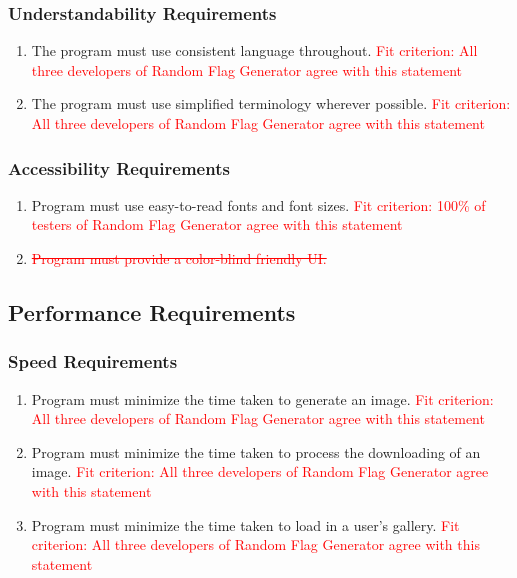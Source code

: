 \documentclass[12pt, titlepage]{article}
\begin{document}
\subsubsection{Understandability Requirements}
\begin{enumerate}[label=UH\arabic*., resume=uhs]
    \item The program must use consistent language throughout. \textcolor{red}{Fit criterion: All three developers of Random Flag Generator agree with this statement}
    \item The program must use simplified terminology wherever possible. \textcolor{red}{Fit criterion: All three developers of Random Flag Generator agree with this statement}
\end{enumerate}

\subsubsection{Accessibility Requirements}
\begin{enumerate}[label=UH\arabic*., resume=uhs]
    \item Program must use easy-to-read fonts and font sizes. \textcolor{red}{Fit criterion: 100\% of testers of Random Flag Generator agree with this statement}
    \item \textcolor{red}{\sout{Program must provide a color-blind friendly UI.}}
\end{enumerate}

\subsection{Performance Requirements}
\subsubsection{Speed Requirements}
\begin{enumerate}[label=PE\arabic*., series=pes]
    \item Program must minimize the time taken to generate an image. \textcolor{red}{Fit criterion: All three developers of Random Flag Generator agree with this statement}
    \item Program must minimize the time taken to process the downloading of an image. \textcolor{red}{Fit criterion: All three developers of Random Flag Generator agree with this statement}
    \item Program must minimize the time taken to load in a user's gallery. \textcolor{red}{Fit criterion: All three developers of Random Flag Generator agree with this statement}
\end{enumerate}
\end{document}

